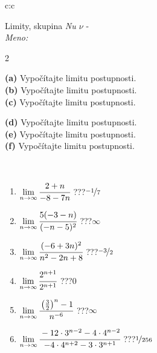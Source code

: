 \documentclass[10pt]{report}
\begin{document}
\newpage
\thispagestyle{empty}
\begin{tabular}{c:c}
\begin{minipage}[c][104.5mm][t]{0.5\linewidth}
\begin{center}
\vspace{5mm}
{\huge Limity, skupina \textit{Nu $\nu$} -}\\[5mm]
\textit{Meno:}\phantom{xxxxxxxxxxxxxxxxxxxxxxxxxxxxxxxxxxxxxxxxxxxxxxxxxxxxxxxxxxxxxxxxx}\\[5mm]
\begin{minipage}{0.95\linewidth}
\begin{center}
{\small \begin{multicols}{2} \raggedright
\textbf{(a)} Vypočítajte limitu postupnosti. \\[1mm]
\textbf{(b)} Vypočítajte limitu postupnosti. \\[1mm]
\textbf{(c)} Vypočítajte limitu postupnosti. \par \columnbreak
\textbf{(d)} Vypočítajte limitu postupnosti. \\[1mm]
\textbf{(e)} Vypočítajte limitu postupnosti. \\[1mm]
\textbf{(f)} Vypočítajte limitu postupnosti.
\end{multicols}
}
\end{center}
\end{minipage}
\\[1mm]
\begin{minipage}{0.79\linewidth}
\begin{center}
\begin{varwidth}{\linewidth}
\setlength{\itemsep}{0pt}
\begin{enumerate}
\footnotesizerr
\item $\lim\limits_{n\to\infty}\cfrac{2+n}{-8-7n}$\quad \dotfill\; ???\;\dotfill \quad $\nicefrac{-1}{7}$
\item $\lim\limits_{n\to\infty}\cfrac{5(-3-n)}{(-n-5)^2}$\quad \dotfill\; ???\;\dotfill \quad $\infty$
\item $\lim\limits_{n\to\infty}\cfrac{(-6+3n)^2}{n^2-2n+8}$\quad \dotfill\; ???\;\dotfill \quad $\nicefrac{-3}{2}$
\item $\lim\limits_{n\to\infty}\cfrac{2^{n+1}}{2^{n+1}}$\quad \dotfill\; ???\;\dotfill \quad $0$
\item $\lim\limits_{n\to\infty}\cfrac{\left(\frac{3}{2}\right)^n -1}{n^{-6}}$\quad \dotfill\; ???\;\dotfill \quad $\infty$
\item $\lim\limits_{n\to\infty}\cfrac{-12\cdot 3^{n-2}-4\cdot 4^{n-2}}{-4\cdot 4^{n+2}-3\cdot 3^{n+1}}$\quad \dotfill\; ???\;\dotfill \quad $\nicefrac{1}{256}$

\end{enumerate}
\end{varwidth}
\end{center}
\end{minipage}
\end{center}
\end{minipage}
\end{tabular}
\end{document}
